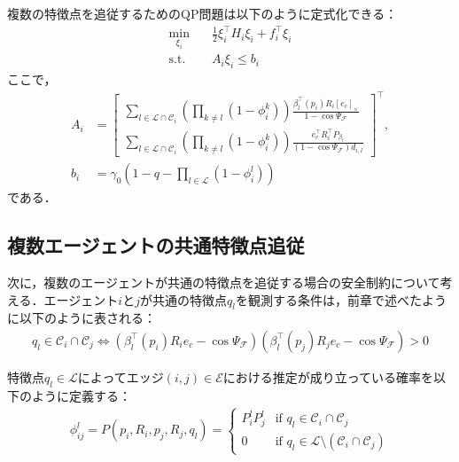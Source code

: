 複数の特徴点を追従するためのQP問題は以下のように定式化できる：
\begin{equation}
\begin{aligned}
\min_{\xi_i} \quad & \frac{1}{2}\xi_i^\top H_i \xi_i + f_i^\top \xi_i \\
\mathrm{s.t.} \quad & A_i \xi_i \leq b_i
\label{eq:multi_cbf_qp}
\end{aligned}
\end{equation}
ここで，
\begin{equation}
\begin{aligned}
A_i &= \begin{bmatrix}
\sum_{l \in \mathcal{L} \cap \mathcal{C}_i}\left(\prod_{k \neq l}(1 - \phi_i^k)\right) \frac{\beta_l^\top(p_i) R_i [e_c]_\times}{1 - \cos\Psi_\mathcal{F}} \\
\sum_{l \in \mathcal{L} \cap \mathcal{C}_i}\left(\prod_{k \neq l}(1 - \phi_i^k)\right) \frac{e_c^\top R_i^\top P_{\beta_l}}{(1 - \cos\Psi_\mathcal{F})d_{i,l}}
\end{bmatrix}^\top, \\
b_i &= \gamma_0 \left(1 - q - \prod_{l \in \mathcal{L}}(1 - \phi_i^l)\right)
\label{eq:multi_cbf_qp_params}
\end{aligned}
\end{equation}
である．

\subsection{複数エージェントの共通特徴点追従}

次に，複数のエージェントが共通の特徴点を追従する場合の安全制約について考える．エージェント$i$と$j$が共通の特徴点$q_l$を観測する条件は，前章で述べたように以下のように表される：
\begin{equation}
\begin{aligned}
q_l \in \mathcal{C}_i \cap \mathcal{C}_j \iff (\beta_l^{\top}(p_i)R_ie_c - \cos\Psi_\mathcal{F})(\beta_l^{\top}(p_j)R_je_c - \cos\Psi_\mathcal{F}) > 0
\label{eq:common_fov_condition}
\end{aligned}
\end{equation}

特徴点$q_l \in \mathcal{L}$によってエッジ$(i,j) \in \mathcal{E}$における推定が成り立っている確率を以下のように定義する：
\begin{equation}
\begin{aligned}
\phi_{ij}^l = P(p_i, R_i, p_j, R_j, q_l) = 
\begin{cases}
P_i^l P_j^l & \text{if } q_l \in \mathcal{C}_i \cap \mathcal{C}_j \\
0 & \text{if } q_l \in \mathcal{L} \setminus (\mathcal{C}_i \cap \mathcal{C}_j)
\end{cases}
\label{eq:common_probability}
\end{aligned}
\end{equation}


